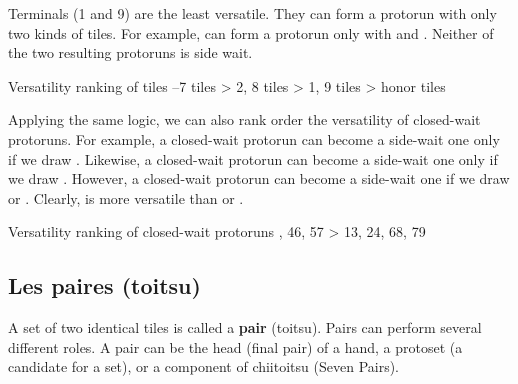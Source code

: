 \bigskip
Terminals (1 and 9) are the least versatile. They can form a protorun with only two kinds of tiles. For example, {\LARGE{}} can form a protorun only with {\LARGE{}} and {\LARGE{}}. Neither of the two resulting protoruns is side wait. 

\color{MyRed}
\begin{itembox}[c]{Versatility ranking of tiles}
\centering{}--7 tiles > 2, 8 tiles > 1, 9 tiles > honor tiles
\end{itembox}
\normalcolor
\bigskip
Applying the same logic, we can also rank order the versatility of closed-wait protoruns. 
For example, a closed-wait protorun {\LARGE{}} can become a side-wait one only if we draw {\LARGE{}}. Likewise, a closed-wait protorun {\LARGE{}} can become a side-wait one only if we draw {\LARGE{}}. However, a closed-wait protorun {\LARGE{}} can become a side-wait one if we draw {\LARGE{}} or {\LARGE{}}. Clearly, {\LARGE{}} is more versatile than {\LARGE{}} or {\LARGE{}}. 

\color{MyRed}
\begin{itembox}[c]{Versatility ranking of closed-wait protoruns}
\centering{}, 46, 57 > 13, 24, 68, 79
\end{itembox} 
\normalcolor
\bigskip

\subsection{Les paires ({\jap toitsu})}\label{sec:closevers}
 

A set of two identical tiles is called a {\bf pair} ({\jap toitsu}). 
Pairs can perform several different roles. A pair can be the head (final pair) of a hand, a protoset (a candidate for a set), or a component of {\jap chiitoitsu} (Seven Pairs). 

\bigskip

